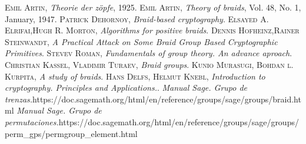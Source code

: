 \documentclass[12pt]{article}
\theoremstyle{definition}
\begin{document}
\begin{thebibliography}{X}
\textsc{Emil Artin}, \textit{Theorie der z\"opfe}, 1925.
\textsc{Emil Artin}, \textit{Theory of braids}, Vol. 48, No. 1, January, 1947.
\textsc{Patrick Dehornoy}, \textit{Braid-based cryptography}.
\textsc{Elsayed A. Elrifai},\textsc{Hugh R. Morton}, \textit{Algorithms for positive braids}.
\textsc{Dennis Hofheinz},\textsc{Rainer Steinwandt}, \textit{A Practical Attack on Some Braid Group Based
Cryptographic Primitives}.
\textsc{Stevev Roman}, \textit{Fundamentals of group theory. An advance aproach}.
\textsc{Christian Kassel}, \textsc{Vladimir Turaev}, \textit{Braid groups}.
\textsc{Kunio Murasugi}, \textsc{Bohdan l. Kurpita}, \textit{A study of braids}.
\textsc{Hans Delfs}, \textsc{Helmut Knebl}, \textit{Introduction to cryptography. Principles and Applications.}.
\textit{Manual Sage. Grupo de trenzas.}\newline https://doc.sagemath.org/html/en/reference/groups/sage/groups/braid.html
 \textit{Manual Sage. Grupo de permutaciones.}\newline https://doc.sagemath.org/html/en/reference/groups/sage/groups/perm\_gps/\newline permgroup\_element.html
\end{thebibliography}













		
\end{document}
